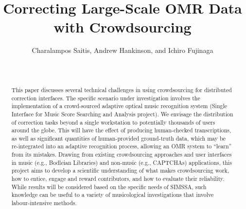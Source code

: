 \documentclass{sig-alternate}
\begin{document}


\title{Correcting Large-Scale OMR Data with Crowdsourcing}

\author{
\alignauthor
Charalampos Saitis, Andrew Hankinson, and Ichiro Fujinaga\\
       \vspace{4pt}
       \\
       \\
       \vspace{4pt}
}
% 
\maketitle
\begin{abstract}
This paper discusses several technical challenges in using crowdsourcing for distributed correction interfaces. The specific scenario under investigation involves the implementation of a crowd-sourced adaptive optical music recognition system (Single Interface for Music Score Searching and Analysis project). We envisage the distribution of correction tasks beyond a single workstation to potentially thousands of users around the globe. This will have the effect of producing human-checked transcriptions, as well as significant quantities of human-provided ground-truth data, which may be re-integrated into an adaptive recognition process, allowing an OMR system to ``learn'' from its mistakes. Drawing from existing crowdsourcing approaches and user interfaces in music (e.g., Bodleian Libraries) and non-music (e.g., CAPTCHAs) applications, this project aims to develop a scientific understanding of what makes crowdsourcing work, how to entice, engage and reward contributors, and how to evaluate their reliability. While results will be considered based on the specific needs of SIMSSA, such knowledge can be useful to a variety of musicological investigations that involve labour-intensive methods.
\end{abstract}
\end{document}
